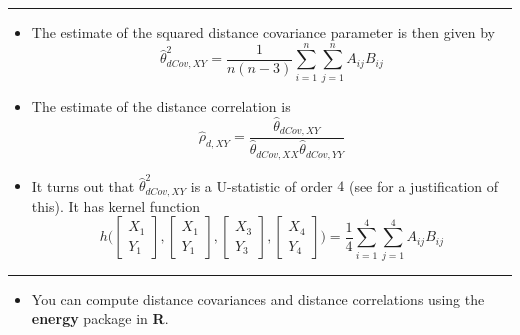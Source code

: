 \documentclass[]{book}
\providecommand{\tightlist}{%
  \setlength{\itemsep}{0pt}\setlength{\parskip}{0pt}}
\begin{document}
\begin{center}\rule{0.5\linewidth}{\linethickness}\end{center}

\begin{itemize}
\item
  The estimate of the squared distance covariance parameter is then given by
  \begin{equation}
  \hat{\theta}_{dCov,XY}^{2} = \frac{1}{n(n-3)}\sum_{i=1}^{n}\sum_{j=1}^{n} A_{ij}B_{ij}
  \end{equation}
\item
  The estimate of the distance correlation is
  \begin{equation}
  \hat{\rho}_{d, XY} = \frac{ \hat{\theta}_{dCov,XY} }{\hat{\theta}_{dCov,XX} \hat{\theta}_{dCov, YY} } 
  \end{equation}
\item
  It turns out that \(\hat{\theta}_{dCov, XY}^{2}\) is a U-statistic of order \(4\) (see \citet{huo2016} for a justification of this).
  It has kernel function
  \begin{equation}
  h\Bigg( \begin{bmatrix} X_{1} \\ Y_{1} \end{bmatrix}, \begin{bmatrix} X_{1} \\ Y_{1} \end{bmatrix},
  \begin{bmatrix} X_{3} \\ Y_{3} \end{bmatrix}, \begin{bmatrix} X_{4} \\ Y_{4}\end{bmatrix} \Bigg) 
  = \frac{1}{4}\sum_{i=1}^{4}\sum_{j=1}^{4} A_{ij}B_{ij}
  \end{equation}
\end{itemize}

\begin{center}\rule{0.5\linewidth}{\linethickness}\end{center}

\begin{itemize}
\tightlist
\item
  You can compute distance covariances and distance correlations using the \textbf{energy} package in \textbf{R}.
\end{itemize}
\end{document}
